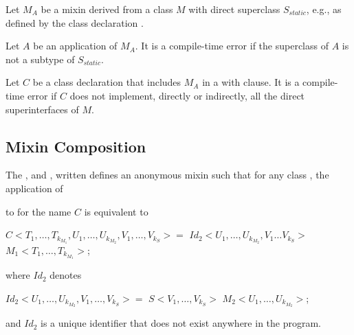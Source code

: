 \documentclass[makeidx]{article}
\begin{document}
\LMHash{}%
Let $M_A$ be a mixin derived from a class $M$ with direct superclass $S_{static}$, e.g., as defined by the class declaration .

\LMHash{}%
Let $A$ be an application of $M_A$.
It is a compile-time error if the superclass of $A$ is not a subtype of $S_{static}$.

\LMHash{}%
Let $C$ be a class declaration that includes $M_A$ in a with clause.
It is a compile-time error if $C$ does not implement, directly or indirectly, all the direct superinterfaces of $M$.


\subsection{Mixin Composition}


\LMHash{}%
The ,
 and
, written
defines an anonymous mixin such that for any class
,
the application of


to  for the name $C$ is equivalent to

\begin{normativeDartCode}
\ABSTRACT{} \CLASS{} $C<T_1, \ldots, T_{k_{M_1}}, U_1, \ldots, U_{k_{M_2}}, V_1, \ldots, V_{k_S}> = $
      $Id_2<U_1, \ldots, U_{k_{M_2}}, V_1 \ldots V_{k_S}>$ \WITH{} $M_1 <T_1, \ldots, T_{k_{M_1}}>$;
\end{normativeDartCode}

where $Id_2$ denotes

\begin{normativeDartCode}
\ABSTRACT{} \CLASS{} $Id_2<U_1, \ldots, U_{k_{M_2}}, V_1, \ldots, V_{k_S}> =$
                         $S<V_1, \ldots, V_{k_S}>$ \WITH{} $M_2<U_1, \ldots, U_{k_{M_2}}>$;
\end{normativeDartCode}

and $Id_2$ is a unique identifier that does not exist anywhere in the program.
\end{document}
